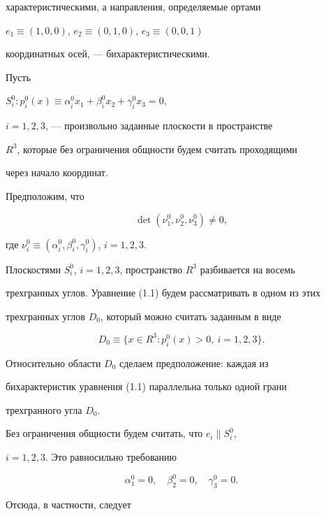 характеристическими, а направления, определяемые ортами


$e_1\equiv(1,0,0)$, $e_2\equiv(0,1,0)$, $e_3\equiv(0,0,1)$


координатных осей, --- бихарактеристическими.





Пусть


$S^0_i:p^0_i(x)\equiv\alpha^0_i x_1+\beta^0_i x_2+\gamma^0_i x_3=0$,


$i=1,2,3$, --- произвольно заданные плоскости в пространстве


$R^3$, которые без ограничения общности будем считать проходящими


через начало координат.





Предположим, что


\begin{equation}


\det(\nu^0_1,\nu^0_2,\nu^0_3)\ne 0,


\end{equation}


где $\nu^0_i\equiv(\alpha^0_i,\beta^0_i,\gamma^0_i)$, $i=1,2,3$.


Плоскостями $S^0_i$, $i=1,2,3$, пространство $R^3$ разбивается на восемь


трехгранных углов. Уравнение (1.1) будем рассматривать в одном из этих


трехгранных углов $D_0$, который можно считать заданным в виде


$$


D_0\equiv\{x\in R^3:p^0_i(x)>0,\ i=1,2,3\}.


$$


Относительно области $D_0$ сделаем предположение: каждая из


бихарактеристик уравнения (1.1) параллельна только одной грани


трехгранного угла $D_0$.


Без ограничения общности будем считать, что $e_i\parallel S^0_i$,


$i=1,2,3$. Это равносильно требованию


$$


\alpha^0_1=0,\quad \beta^0_2=0,\quad \gamma^0_3=0.


$$


Отсюда, в частности, следует



